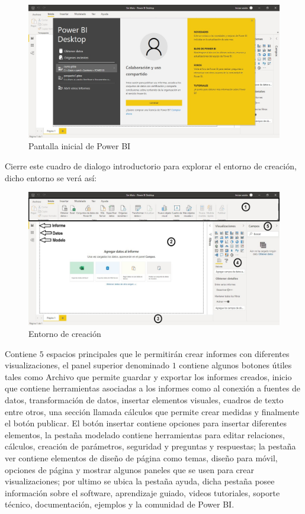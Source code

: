 \documentclass[
]{book}
\begin{document}
\begin{figure}

{\centering \includegraphics[width=0.8\linewidth]{Imágenes/powerbi5} 

}

\caption{Pantalla inicial de Power BI}\label{fig:pantallainicialpowerbi-fig}
\end{figure}

Cierre este cuadro de dialogo introductorio para explorar el entorno de creación, dicho entorno se verá así:

\begin{figure}

{\centering \includegraphics[width=0.8\linewidth]{Imágenes/powerbi6} 

}

\caption{Entorno de creación}\label{fig:entornocreacionpowerbi-fig}
\end{figure}

Contiene \(5\) espacios principales que le permitirán crear informes con diferentes visualizaciones, el panel superior denominado \(1\) contiene algunos botones útiles tales como Archivo que permite guardar y exportar los informes creados, inicio que contiene herramientas asociadas a los informes como al conexión a fuentes de datos, transformación de datos, insertar elementos visuales, cuadros de texto entre otros, una sección llamada cálculos que permite crear medidas y finalmente el botón publicar. El botón insertar contiene opciones para insertar diferentes elementos, la pestaña modelado contiene herramientas para editar relaciones, cálculos, creación de parámetros, seguridad y preguntas y respuestas; la pestaña ver contiene elementos de diseño de página como temas, diseño para móvil, opciones de página y mostrar algunos paneles que se usen para crear visualizaciones; por ultimo se ubica la pestaña ayuda, dicha pestaña posee información sobre el software, aprendizaje guiado, videos tutoriales, soporte técnico, documentación, ejemplos y la comunidad de Power BI.
\end{document}
